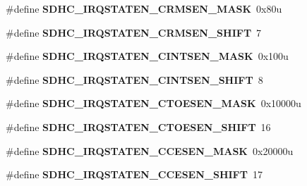 \begin{DoxyCompactItemize}
\item 
\hypertarget{group___s_d_h_c___register___masks_ga14f097ed92b561c75e3dacc1bdefbbe2}{}\#define {\bfseries S\+D\+H\+C\+\_\+\+I\+R\+Q\+S\+T\+A\+T\+E\+N\+\_\+\+C\+R\+M\+S\+E\+N\+\_\+\+M\+A\+S\+K}~0x80u\label{group___s_d_h_c___register___masks_ga14f097ed92b561c75e3dacc1bdefbbe2}

\item 
\hypertarget{group___s_d_h_c___register___masks_ga0e48bc8d0c2f0c10d6daf191c92557a5}{}\#define {\bfseries S\+D\+H\+C\+\_\+\+I\+R\+Q\+S\+T\+A\+T\+E\+N\+\_\+\+C\+R\+M\+S\+E\+N\+\_\+\+S\+H\+I\+F\+T}~7\label{group___s_d_h_c___register___masks_ga0e48bc8d0c2f0c10d6daf191c92557a5}

\item 
\hypertarget{group___s_d_h_c___register___masks_ga69074c27b92cbce82403e14f1e5a1560}{}\#define {\bfseries S\+D\+H\+C\+\_\+\+I\+R\+Q\+S\+T\+A\+T\+E\+N\+\_\+\+C\+I\+N\+T\+S\+E\+N\+\_\+\+M\+A\+S\+K}~0x100u\label{group___s_d_h_c___register___masks_ga69074c27b92cbce82403e14f1e5a1560}

\item 
\hypertarget{group___s_d_h_c___register___masks_gaa1112928a54703734f7cdc45ae77b56f}{}\#define {\bfseries S\+D\+H\+C\+\_\+\+I\+R\+Q\+S\+T\+A\+T\+E\+N\+\_\+\+C\+I\+N\+T\+S\+E\+N\+\_\+\+S\+H\+I\+F\+T}~8\label{group___s_d_h_c___register___masks_gaa1112928a54703734f7cdc45ae77b56f}

\item 
\hypertarget{group___s_d_h_c___register___masks_ga672bdead3330e451e5e34d9f3a707504}{}\#define {\bfseries S\+D\+H\+C\+\_\+\+I\+R\+Q\+S\+T\+A\+T\+E\+N\+\_\+\+C\+T\+O\+E\+S\+E\+N\+\_\+\+M\+A\+S\+K}~0x10000u\label{group___s_d_h_c___register___masks_ga672bdead3330e451e5e34d9f3a707504}

\item 
\hypertarget{group___s_d_h_c___register___masks_gae43f3a8fe91869f92453ef67ea0f4764}{}\#define {\bfseries S\+D\+H\+C\+\_\+\+I\+R\+Q\+S\+T\+A\+T\+E\+N\+\_\+\+C\+T\+O\+E\+S\+E\+N\+\_\+\+S\+H\+I\+F\+T}~16\label{group___s_d_h_c___register___masks_gae43f3a8fe91869f92453ef67ea0f4764}

\item 
\hypertarget{group___s_d_h_c___register___masks_gab4c7b840945f9d7fbc1912e6b210ab77}{}\#define {\bfseries S\+D\+H\+C\+\_\+\+I\+R\+Q\+S\+T\+A\+T\+E\+N\+\_\+\+C\+C\+E\+S\+E\+N\+\_\+\+M\+A\+S\+K}~0x20000u\label{group___s_d_h_c___register___masks_gab4c7b840945f9d7fbc1912e6b210ab77}

\item 
\hypertarget{group___s_d_h_c___register___masks_ga373ff5b200a397f6c4a71a9e831ee6c8}{}\#define {\bfseries S\+D\+H\+C\+\_\+\+I\+R\+Q\+S\+T\+A\+T\+E\+N\+\_\+\+C\+C\+E\+S\+E\+N\+\_\+\+S\+H\+I\+F\+T}~17\label{group___s_d_h_c___register___masks_ga373ff5b200a397f6c4a71a9e831ee6c8}


\end{DoxyCompactItemize}
